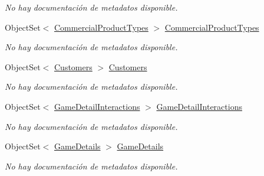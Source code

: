 \begin{DoxyCompactItemize}
\begin{DoxyCompactList}\small\item\em No hay documentación de metadatos disponible. \end{DoxyCompactList}\item 
Object\-Set$<$ \hyperlink{class_microsoft_1_1_samples_1_1_kinect_1_1_basic_interactions_1_1_commercial_product_types}{Commercial\-Product\-Types} $>$ \hyperlink{class_microsoft_1_1_samples_1_1_kinect_1_1_basic_interactions_1_1_o_m_k_t_d_b_entities_a648fc5422fa93289fe2e6bb954c2cbcc}{Commercial\-Product\-Types}
\begin{DoxyCompactList}\small\item\em No hay documentación de metadatos disponible. \end{DoxyCompactList}\item 
Object\-Set$<$ \hyperlink{class_microsoft_1_1_samples_1_1_kinect_1_1_basic_interactions_1_1_customers}{Customers} $>$ \hyperlink{class_microsoft_1_1_samples_1_1_kinect_1_1_basic_interactions_1_1_o_m_k_t_d_b_entities_a6ea429814f877ea851b1c4926f2ec37a}{Customers}
\begin{DoxyCompactList}\small\item\em No hay documentación de metadatos disponible. \end{DoxyCompactList}\item 
Object\-Set$<$ \hyperlink{class_microsoft_1_1_samples_1_1_kinect_1_1_basic_interactions_1_1_game_detail_interactions}{Game\-Detail\-Interactions} $>$ \hyperlink{class_microsoft_1_1_samples_1_1_kinect_1_1_basic_interactions_1_1_o_m_k_t_d_b_entities_aa52a9e1c35e71a14c633df01d7d7a56f}{Game\-Detail\-Interactions}
\begin{DoxyCompactList}\small\item\em No hay documentación de metadatos disponible. \end{DoxyCompactList}\item 
Object\-Set$<$ \hyperlink{class_microsoft_1_1_samples_1_1_kinect_1_1_basic_interactions_1_1_game_details}{Game\-Details} $>$ \hyperlink{class_microsoft_1_1_samples_1_1_kinect_1_1_basic_interactions_1_1_o_m_k_t_d_b_entities_ad370f670818749d3d218f03e94e4f9c7}{Game\-Details}
\begin{DoxyCompactList}\small\item\em No hay documentación de metadatos disponible. \end{DoxyCompactList}\item 

\end{DoxyCompactItemize}
